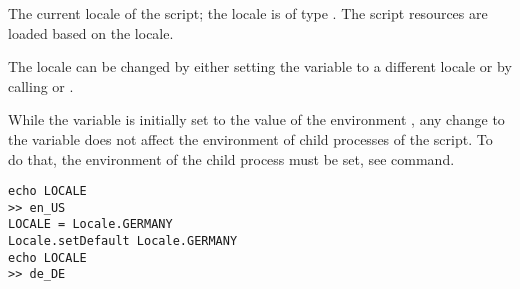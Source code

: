 %

The current locale of the script; the locale is of 
type \cite{locale13}. The script resources 
are loaded based on the locale. 

The locale can be changed by either setting the variable to
a different locale or by calling 
 or
.

While the  variable is initially set to the value of the environment
, any change to the \cite{posixenviron13} variable does not affect the
environment of child processes of the script. To do that, the environment of
the child process must be set, see  command.

\begin{lstlisting}[style=Groovybash, label={lst:example_variable_pwd}]
echo LOCALE
>> en_US
LOCALE = Locale.GERMANY
Locale.setDefault Locale.GERMANY
echo LOCALE
>> de_DE
\end{lstlisting}

